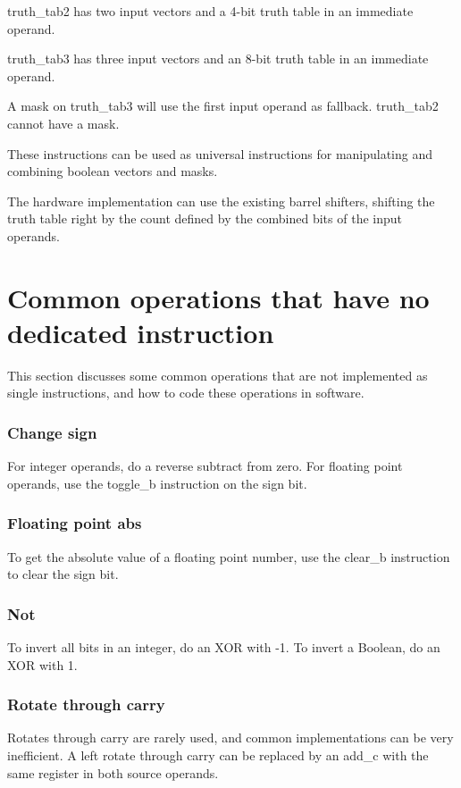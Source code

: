 \documentclass[forwardcom.tex]{subfiles}
\begin{document}
truth\_tab2 has two input vectors and a 4-bit truth table in an immediate operand.
\vspace{2mm}

truth\_tab3 has three input vectors and an 8-bit truth table in an immediate operand.
\vspace{2mm}

A mask on truth\_tab3 will use the first input operand as fallback. truth\_tab2 cannot have a mask.
\vspace{2mm}

These instructions can be used as universal instructions for manipulating and combining boolean vectors and masks.
\vspace{2mm}

The hardware implementation can use the existing barrel shifters, shifting the truth table right by the count defined by the combined bits of the input operands.



\section{Common operations that have no dedicated instruction}
This section discusses some common operations that are not implemented as single instructions, and how to code these operations in software.

\subsubsection{Change sign}
For integer operands, do a reverse subtract from zero. For floating point operands, use the toggle\_b instruction on the sign bit.

\subsubsection{Floating point abs}
To get the absolute value of a floating point number, use the clear\_b instruction to clear the sign bit.

\subsubsection{Not}
To invert all bits in an integer, do an XOR with -1. To invert a Boolean, do an XOR with 1.

\subsubsection{Rotate through carry}
Rotates through carry are rarely used, and common implementations can be very inefficient. A left rotate through carry can be replaced by an add\_c with the same register in both source operands.
\end{document}
